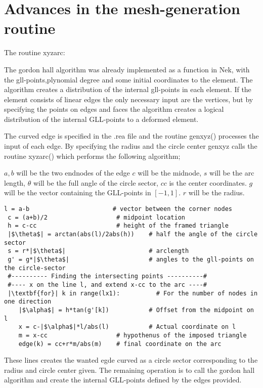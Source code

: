 \section{Advances in the mesh-generation routine}
The routine xyzarc:

The gordon hall algorithm was already implemented as a function in Nek, with the gll-points,plynomial degree and some initial 
coordinates to the element. The algorithm creates a distribution of the internal gll-points in each element. 
If the element consists of linear edges the only necessary input are the vertices, but by specifying the points on edges and faces
the algorithm creates a logical distribution of the internal GLL-points to a deformed element. 

The curved edge is specified in the .rea file and the routine genxyz() processes the input of each edge. 
By specifying the radius and the circle center genxyz calls the routine xyzarc() which performs the following algorithm;

    $a,b$ will be the two endnodes of the edge 
    $c$ will be the midnode, $s$ will be the arc length, $\theta$ will be the full angle of the circle sector, $cc$ is the center coordinates.
    $g$ will be the vector containing the GLL-points in $[-1,1]$. $r$ will be the radius.

\begingroup
\fontsize{12pt}{14pt}
\begin{lstlisting}[escapechar=|]
 l = a-b                       # vector between the corner nodes
 c = (a+b)/2                   # midpoint location
 h = c-cc                      # height of the framed triangle
 |$\theta$| = arctan(abs(l)/2abs(h))    # half the angle of the circle sector
 s = r*|$\theta$|                       # arclength
 g' = g*|$\theta$|                      # angles to the gll-points on the circle-sector
 #---------- Finding the intersecting points ----------#
 #---- x on the line l, and extend x-cc to the arc ----#
 |\textbf{for}| k in range(lx1):          # For the number of nodes in one direction
    |$\alpha$| = h*tan(g'[k])           # Offset from the midpoint on l
    x = c-|$\alpha$|*l/abs(l)           # Actual coordinate on l
    m = x-cc                   # hypothenus of the imposed triangle
    edge(k) = cc+r*m/abs(m)    # final coordinate on the arc
\end{lstlisting}
\endgroup
These lines creates the wanted egde curved as a circle sector corresponding to the radius and circle center given.
The remaining operation is to call the gordon hall algorithm and create the internal GLL-points defined by the edges 
provided.


